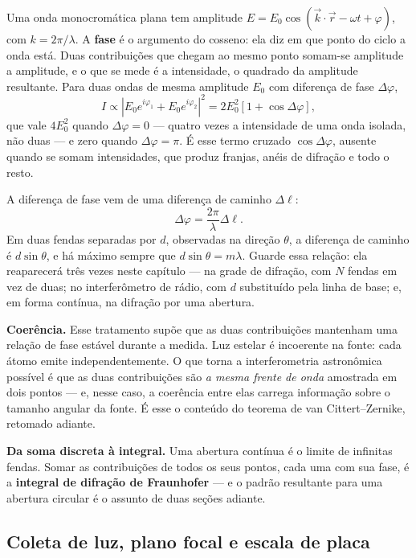 \documentclass[11pt,a4paper]{article}
\begin{document}
Uma onda monocromática plana tem amplitude $E=E_0\cos(\vec{k}\cdot\vec{r}-\omega t+\varphi)$, com
$k=2\pi/\lambda$. A \textbf{fase} é o argumento do cosseno: ela diz em que ponto do ciclo a onda está. Duas
contribuições que chegam ao mesmo ponto somam-se amplitude a amplitude, e o que se mede é a intensidade, o
quadrado da amplitude resultante. Para duas ondas de mesma amplitude $E_0$ com diferença de fase $\Delta\varphi$,
\[
I\propto\left|E_0e^{i\varphi_1}+E_0e^{i\varphi_2}\right|^{2}
=2E_0^{2}\left[1+\cos\Delta\varphi\right],
\]
que vale $4E_0^{2}$ quando $\Delta\varphi=0$ --- quatro vezes a intensidade de uma onda isolada, não duas --- e
zero quando $\Delta\varphi=\pi$. É esse termo cruzado $\cos\Delta\varphi$, ausente quando se somam intensidades,
que produz franjas, anéis de difração e todo o resto.

A diferença de fase vem de uma diferença de caminho $\Delta\ell$:
\[
\Delta\varphi=\frac{2\pi}{\lambda}\Delta\ell.
\]
Em duas fendas separadas por $d$, observadas na direção $\theta$, a diferença de caminho é $d\sin\theta$, e há
máximo sempre que $d\sin\theta=m\lambda$. Guarde essa relação: ela reaparecerá três vezes neste capítulo --- na
grade de difração, com $N$ fendas em vez de duas; no interferômetro de rádio, com $d$ substituído pela linha de
base; e, em forma contínua, na difração por uma abertura.

\textbf{Coerência.} Esse tratamento supõe que as duas contribuições mantenham uma relação de fase estável durante
a medida. Luz estelar é incoerente na fonte: cada átomo emite independentemente. O que torna a interferometria
astronômica possível é que as duas contribuições são \emph{a mesma frente de onda} amostrada em dois pontos ---
e, nesse caso, a coerência entre elas carrega informação sobre o tamanho angular da fonte. É esse o conteúdo do
teorema de van Cittert--Zernike, retomado adiante.

\textbf{Da soma discreta à integral.} Uma abertura contínua é o limite de infinitas fendas. Somar as
contribuições de todos os seus pontos, cada uma com sua fase, é a \textbf{integral de difração de Fraunhofer} ---
e o padrão resultante para uma abertura circular é o assunto de duas seções adiante.

\subsection*{Coleta de luz, plano focal e escala de placa}
\end{document}
